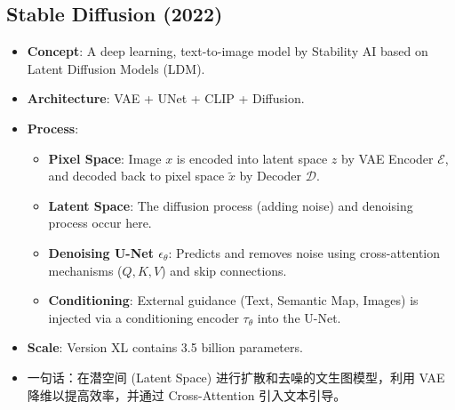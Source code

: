 \documentclass[UTF8]{ctexart}
\begin{document}
\subsection{Stable Diffusion (2022)}
\begin{itemize}
    \item \textbf{Concept}: A deep learning, text-to-image model by Stability AI based on Latent Diffusion Models (LDM).
    \item \textbf{Architecture}: VAE + UNet + CLIP + Diffusion.
    \item \textbf{Process}:
    \begin{itemize}
        \item \textbf{Pixel Space}: Image $x$ is encoded into latent space $z$ by VAE Encoder $\mathcal{E}$, and decoded back to pixel space $\tilde{x}$ by Decoder $\mathcal{D}$.
        \item \textbf{Latent Space}: The diffusion process (adding noise) and denoising process occur here. 
        \item \textbf{Denoising U-Net $\epsilon_\theta$}: Predicts and removes noise using cross-attention mechanisms ($Q, K, V$) and skip connections.
        \item \textbf{Conditioning}: External guidance (Text, Semantic Map, Images) is injected via a conditioning encoder $\tau_\theta$ into the U-Net.
    \end{itemize}
    \item \textbf{Scale}: Version XL contains 3.5 billion parameters.
    \item 一句话：在潜空间 (Latent Space) 进行扩散和去噪的文生图模型，利用 VAE 降维以提高效率，并通过 Cross-Attention 引入文本引导。
\end{itemize}
\end{document}
